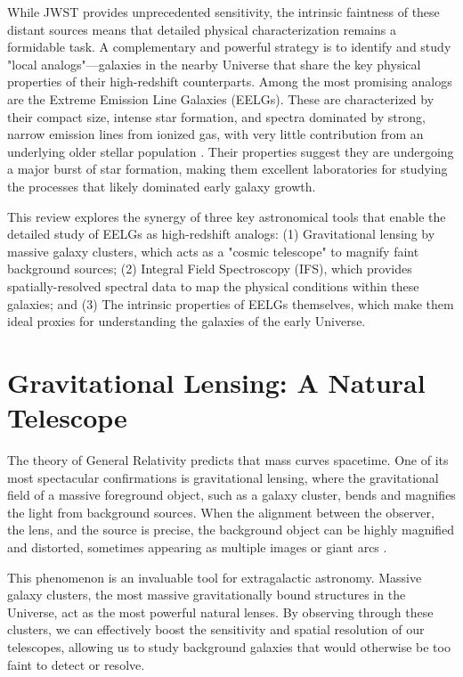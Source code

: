\documentclass[fleqn,usenatbib]{mnras}
\begin{document}
While JWST provides unprecedented sensitivity, the intrinsic faintness of these distant sources means that detailed physical characterization remains a formidable task. A complementary and powerful strategy is to identify and study "local analogs"—galaxies in the nearby Universe that share the key physical properties of their high-redshift counterparts. Among the most promising analogs are the Extreme Emission Line Galaxies (EELGs). These are characterized by their compact size, intense star formation, and spectra dominated by strong, narrow emission lines from ionized gas, with very little contribution from an underlying older stellar population \citep{Jiang2019}. Their properties suggest they are undergoing a major burst of star formation, making them excellent laboratories for studying the processes that likely dominated early galaxy growth.

This review explores the synergy of three key astronomical tools that enable the detailed study of EELGs as high-redshift analogs: (1) Gravitational lensing by massive galaxy clusters, which acts as a "cosmic telescope" to magnify faint background sources; (2) Integral Field Spectroscopy (IFS), which provides spatially-resolved spectral data to map the physical conditions within these galaxies; and (3) The intrinsic properties of EELGs themselves, which make them ideal proxies for understanding the galaxies of the early Universe.

\section{Gravitational Lensing: A Natural Telescope}

The theory of General Relativity predicts that mass curves spacetime. One of its most spectacular confirmations is gravitational lensing, where the gravitational field of a massive foreground object, such as a galaxy cluster, bends and magnifies the light from background sources. When the alignment between the observer, the lens, and the source is precise, the background object can be highly magnified and distorted, sometimes appearing as multiple images or giant arcs \citep{Jauzac2018}.

This phenomenon is an invaluable tool for extragalactic astronomy. Massive galaxy clusters, the most massive gravitationally bound structures in the Universe, act as the most powerful natural lenses. By observing through these clusters, we can effectively boost the sensitivity and spatial resolution of our telescopes, allowing us to study background galaxies that would otherwise be too faint to detect or resolve.
\end{document}
